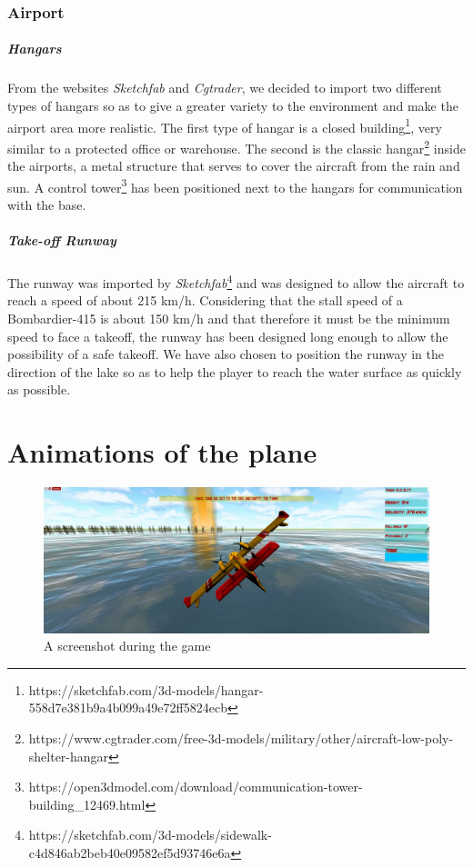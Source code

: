\documentclass{article}
\begin{document}
\subsubsection*{Airport}

\subparagraph*{Hangars}
From the websites \textit{Sketchfab} and \textit{Cgtrader}, we decided to import two different types of hangars so as to give a greater variety to the environment and make the airport area more realistic. The first type of hangar is a closed building\footnote{https://sketchfab.com/3d-models/hangar-558d7e381b9a4b099a49e72ff5824ecb}, very similar to a protected office or warehouse.
The second is the classic hangar\footnote{https://www.cgtrader.com/free-3d-models/military/other/aircraft-low-poly-shelter-hangar} inside the airports, a metal structure that serves to cover the aircraft from the rain and sun. A control tower\footnote{https://open3dmodel.com/download/communication-tower-building\_12469.html} has been positioned next to the hangars for communication with the base.

\subparagraph*{Take-off Runway}
The runway was imported by \textit{Sketchfab}\footnote{https://sketchfab.com/3d-models/sidewalk-c4d846ab2beb40e09582ef5d93746e6a} and was designed to allow the aircraft to reach a speed of about 215 km/h. Considering that the stall speed of a Bombardier-415 is about 150 km/h and that therefore it must be the minimum speed to face a takeoff, the runway has been designed long enough to allow the possibility of a safe takeoff. We have also chosen to position the runway in the direction of the lake so as to help the player to reach the water surface as quickly as possible. 

\newpage
\section*{Animations of the plane}

\begin{figure}[h!]
  \includegraphics[width=\linewidth]{ImmaginiReport/schermata.png}
  \caption{A screenshot during the game}
\end{figure}
\end{document}

